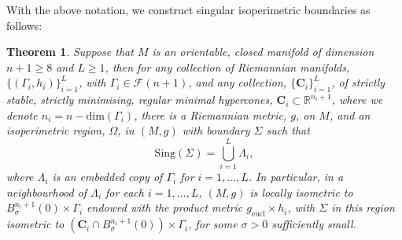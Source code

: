 \documentclass[12pt]{article}
\newtheorem{theorem}{Theorem}
\begin{document}
With the above notation, we construct singular isoperimetric boundaries as follows:

\begin{theorem}\label{thm: singular constructions}
    Suppose that $M$ is an orientable, closed manifold of dimension $n+1\ge 8$ and $L \geq 1$, then for any collection of Riemannian manifolds, $\{(\Gamma_i, h_i)\}_{i=1}^L$,
    with $\Gamma_i\in \mathcal{F}(n+1)$, and any collection, $\{\mathbf{C}_i\}_{i = 1}^L$, of strictly stable, strictly minimising, regular minimal hypercones, $\mathbf{C}_i\subset \mathbb{R}^{n_i+1}$, where we denote $n_i=n-\mathrm{dim} (\Gamma_i)$, there is a Riemannian metric, $g$, on $M$, and an isoperimetric region, $\Omega$, in $(M,g)$ with boundary $\Sigma$ such that
    \[
    \mathrm{Sing}(\Sigma)=\bigcup_{i=1}^L \Lambda_i,
    \]
    where $\Lambda_i$ is an embedded copy of $\Gamma_i$ for $i=1,\dots,L$. In particular, in a neighbourhood of $\Lambda_i$ for each $i=1,\dots,L$, $(M,g)$ is locally isometric to $B^{n_i+1}_\sigma(0)\times \Gamma_i$
    endowed with the product metric $g_{\mathrm{eucl}}\times h_i$, 
    with $\Sigma$ in this region isometric to $(\mathbf{C}_i \cap B^{n_i+1}_\sigma(0))\times \Gamma_i$, for some $\sigma > 0$ sufficiently small.
\end{theorem}
\end{document}
